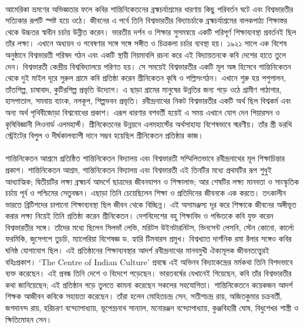 \documentclass{article}
\begin{document}
\paragraph{}
আমেরিকা ভ্রমণের অভিজ্ঞতার ফলে কবির শান্তিনিকেতনের ব্রহ্মচর্যাশ্রমের ধারণায় কিছু পরিবর্তন ঘটে এবং বিশ্বভারতীর সত্যিকার রূপটি স্পষ্ট হয়ে ওঠে। জীবনের এ পর্বে তিনি বিশ্বভারতীর বিদ্যাচর্চাকে ব্রহ্মচর্যাশ্রমের বালকপাঠ্য শিক্ষাস্তর থেকে উচ্চতর স্বাধীন চর্চায় উন্নীত করেন। ভারতীয় দর্শন ও শিক্ষার সুসমন্বয়ে একটি পরিপূর্ণ শিক্ষাব্যবস্থা প্রবর্তনই ছিল তাঁর লক্ষ্য। এখানে অধ্যয়ন ও গবেষণার সঙ্গে সঙ্গে সঙ্গীত ও চিত্রকলা চর্চার ব্যবস্থা হয়। ১৯২১ সালে এক বিশেষ অনুষ্ঠানে বিশ্বভারতী পরিষদ গঠন এবং একটি স্থায়ী নিয়মাবলি রচনা করে এই বিদ্যায়তনকে কবি দেশের হাতে তুলে দেন। বিশ্বভারতী কেন্দ্রীয় বিশ্ববিদ্যালয়ে পরিণত হয়। সে সময়েই বিশ্বভারতীর একটি মূল অঙ্গ হিসেবে শান্তিনিকেতন থেকে দুই মাইল দূরে সুরুল গ্রামে কবি প্রতিষ্ঠা করেন শ্রীনিকেতন কৃষি ও পল্লিসংগঠন। এখানে শুরু হয় পশুপালন, তাঁতশিল্প, চাষাবাদ, কুটিরশিল্প প্রভৃতি উদ্যোগ। এ ছাড়া গ্রামের মানুষের উন্নতির জন্য গড়ে ওঠে গ্রামীণ পাঠাগার, হাসপাতাল, সমবায় ব্যাংক, নলকূপ, শিল্পভবন প্রভৃতি। রবীন্দ্রনাথের নিকট বিশ্বভারতীর একটি অর্থ ছিল বিশ্বকর্ম এবং অন্য অর্থ পৃথিবীজোড়া বিশ্ববোধের প্রকাশ। এরূপ ধারণার বশবর্তী হয়েই এ সময় এখানে যোগ দেন পিয়ারসন ও কৃষিবিজ্ঞানী লিওনার্ড এলমহার্স্ট। শ্রীনিকেতনের উন্নয়নে এলমহার্স্টের অর্থসাহায্য বিশেষভাবে স্মরণীয়। তাঁর স্ত্রী ডরথি স্ট্রেইটের বিপুল ও দীর্ঘকালব্যাপী দানে সম্ভব হয়েছিল শ্রীনিকেতন প্রতিষ্ঠার কাজ।
\paragraph{}
শান্তিনিকেতন আশ্রমে প্রতিষ্ঠিত শান্তিনিকেতন বিদ্যালয় এবং বিশ্বভারতী সম্মিলিতভাবে রবীন্দ্রনাথের মূল শিক্ষাচিন্তার প্রকাশ।  শান্তিনিকেতন আশ্রম, শান্তিনিকেতন বিদ্যালয় এবং বিশ্বভারতী এই তিনটির মধ্যে প্রথমটির রূপ শুধুই আধ্যাত্মিক; দ্বিতীয়টির লক্ষ্য ব্রহ্মচর্য আদর্শে ছাত্রদের জীবনযাপন ও শিক্ষালাভ; আর শেষটির লক্ষ্য মানবতা ও সাংস্কৃতিক চর্চায় পূর্ব ও পশ্চিমের সেতুবন্ধন। এছাড়া তিনি চেয়েছিলেন শিক্ষা ও প্রতিদিনের জীবনকে এক করতে। তৎকালীন ভারতে ব্রিটিশদের চাপানো শিক্ষাব্যবস্থা ছিল জীবন থেকে বিচ্ছিন্ন। এই অসামঞ্জস্য দূর করে শিক্ষাকে জীবনের অঙ্গীভূত করার লক্ষ্য নিয়েই তিনি প্রতিষ্ঠা করেন শ্রীনিকেতন। দেশবিদেশের বহু শিক্ষাবিদ ও পন্ডিতকে কবি যুক্ত করেন বিশ্বভারতীর সঙ্গে। তাঁদের মধ্যে ছিলেন সিলভাঁ লেভি, মরিটস উইনটারনিটস, ভিনসেন্ট লেসনি, স্টেন কোনো, কার্লো ফরমিকি, জুসেপপে তুচচি, ম্যালেরিয়া বিশেষজ্ঞ ড. হ্যারি টিমবারস প্রমুখ। বিশ্বখ্যাত দার্শনিক রমা রঁলার সঙ্গেও কবির ঘনিষ্ঠ যোগাযোগ ছিল। এই প্রতিষ্ঠানের শিক্ষাব্যবস্থার আদর্শ রবীন্দ্রনাথের মানবমুখী ঐক্যমূলক জীবনতত্ত্বেরই বহিঃপ্রকাশ। ‘The Centre of Indian Culture’ প্রবন্ধে এই অভিনব বিদ্যাকেন্দ্রের মর্মকথা তিনি বিশদভাবে ব্যক্ত করেছেন। এই  প্রবন্ধ তিনি দেশে ও বিদেশে পড়েছেন। ভারতবর্ষের যেখানেই গিয়েছেন, কবি তাঁর বিশ্বভারতীর কথা জানিয়েছেন; এই প্রতিষ্ঠান গড়ে তুলতে কামনা করেছেন সকলের সহযোগিতা। শান্তিনিকেতনে কয়েকজন আদর্শ শিক্ষক আজীবন কবিকে সহায়তা করেছেন। তাঁরা হলেন মোহিতচন্দ্র সেন, সতীশচন্দ্র রায়, অজিতকুমার চক্রবর্তী, জগদানন্দ রায়, হরিচরণ বন্দ্যোপাধ্যায়, ভূপেন্দ্রনাথ সান্যাল, মনোরঞ্জন বন্দ্যোপাধ্যায়, কুঞ্জবিহারী ঘোষ, বিধুশেখর শাস্ত্রী ও ক্ষিতিমোহন সেন।
\end{document}
